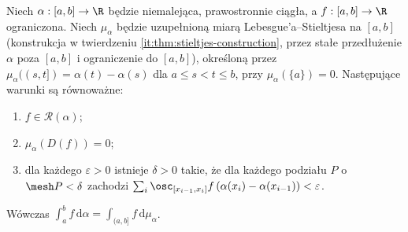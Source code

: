 \begin{twierdzenie}\label{it:thm:rs-oscillation}
Niech $\alpha:[a,b]\to\R$ będzie niemalejąca, prawostronnie ciągła, a $f:[a,b]\to\R$ ograniczona. Niech $\mu_\alpha$ będzie uzupełnioną miarą Lebesgue'a--Stieltjesa na $[a,b]$ (konstrukcja w twierdzeniu \ref{it:thm:stieltjes-construction}, przez stałe przedłużenie $\alpha$ poza $[a,b]$ i ograniczenie do $[a,b]$), określoną przez $\mu_\alpha((s,t])=\alpha(t)-\alpha(s)$ dla $a\le s<t\le b$, przy $\mu_\alpha(\{a\})=0$. Następujące warunki są równoważne:
\begin{enumerate}[label=(\roman*)]
\item $f\in\mathcal R(\alpha)$;
\item $\mu_\alpha(D(f))=0$;
\item dla każdego $\varepsilon>0$ istnieje $\delta>0$ takie, że dla każdego podziału $P$ o $\mesh P<\delta$ zachodzi $\sum_i\osc_{[x_{i-1},x_i]}f\,(\alpha(x_i)-\alpha(x_{i-1}))<\varepsilon$.
\end{enumerate}
Wówczas $\int_a^b f\,\mathrm d\alpha=\int_{(a,b]}f\,\mathrm d\mu_\alpha$.
\end{twierdzenie}
